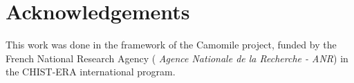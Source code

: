 \documentclass[a4paper]{article}
\begin{document}
        \vspace{-0.3cm}
 \section{Acknowledgements}
  
    This work was done in the framework of the Camomile project, funded by the French National Research Agency ( \textit{Agence Nationale de la Recherche - ANR}) in the CHIST-ERA international program.

  
  \eightpt
  
  
  
\end{document}
